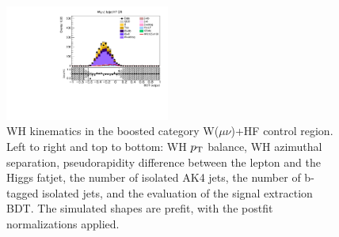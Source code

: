 \begin{figure}[tbp]
\begin{center}
    \includegraphics[width=0.48\textwidth]{figures/wlnhbb2016/boosted/WmnWHHeavyFlavorFJCR_bdtValue.pdf}
    \caption{WH kinematics in the boosted category W($\mu\nu$)+HF control region.
    Left to right and top to bottom: WH $p_{\mathrm{T}}$ balance, WH azimuthal separation,
    pseudorapidity difference between the lepton and the Higgs fatjet,
    the number of isolated AK4 jets, the number of b-tagged isolated jets,
    and the evaluation of the signal extraction BDT.
    The simulated shapes are prefit, with the postfit normalizations applied.}
    \label{fig:boost_WmnHF_WH}
  \end{center}
\end{figure}
\clearpage

